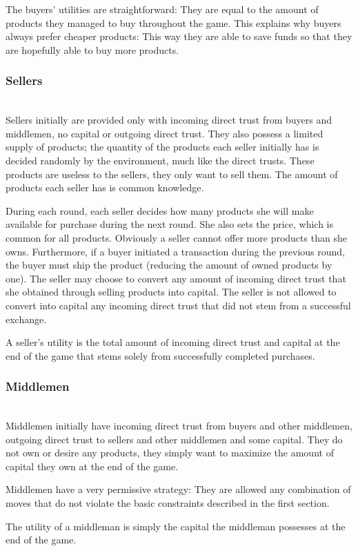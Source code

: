     The buyers' utilities are straightforward: They are equal to the amount of products they managed to buy throughout the
    game. This explains why buyers always prefer cheaper products: This way they are able to save funds so that they are
    hopefully able to buy more products.

  \subsubsection{Sellers} \ \\

    Sellers initially are provided only with incoming direct trust from buyers and middlemen, no capital or outgoing direct
    trust. They also possess a limited supply of products; the quantity of the products each seller initially has is decided
    randomly by the environment, much like the direct trusts. These products are useless to the sellers, they only want to
    sell them. The amount of products each seller has is common knowledge.
    
    During each round, each seller decides how many products she will make available for purchase during the next round. She
    also sets the price, which is common for all products. Obviously a seller cannot offer more products than she owns.
    Furthermore, if a buyer initiated a transaction during the previous round, the buyer must ship the product (reducing the
    amount of owned products by one). The seller may choose to convert any amount of incoming direct trust that she obtained
    through selling products into capital. The seller is not allowed to convert into capital any incoming direct trust that
    did not stem from a successful exchange.

    A seller's utility is the total amount of incoming direct trust and capital at the end of the game that stems solely from
    successfully completed purchases.

  \subsubsection{Middlemen} \ \\

    Middlemen initially have incoming direct trust from buyers and other middlemen, outgoing direct trust to sellers and other
    middlemen and some capital. They do not own or desire any products, they simply want to maximize the amount of capital
    they own at the end of the game.

    Middlemen have a very permissive strategy: They are allowed any combination of moves that do not violate the basic
    constraints described in the first section.

    The utility of a middleman is simply the capital the middleman possesses at the end of the game.
